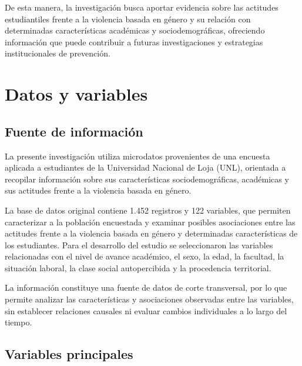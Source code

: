 \documentclass[
  spanish,
  11pt,
  letterpaper,
  DIV=11,
  numbers=noendperiod]{scrreprt}
\begin{document}
De esta manera, la investigación busca aportar evidencia sobre las
actitudes estudiantiles frente a la violencia basada en género y su
relación con determinadas características académicas y
sociodemográficas, ofreciendo información que puede contribuir a futuras
investigaciones y estrategias institucionales de prevención.


\chapter{Datos y variables}\label{datos-y-variables}

\section{Fuente de información}\label{fuente-de-informaciuxf3n}

La presente investigación utiliza microdatos provenientes de una
encuesta aplicada a estudiantes de la Universidad Nacional de Loja
(UNL), orientada a recopilar información sobre sus características
sociodemográficas, académicas y sus actitudes frente a la violencia
basada en género.

La base de datos original contiene 1.452 registros y 122 variables, que
permiten caracterizar a la población encuestada y examinar posibles
asociaciones entre las actitudes frente a la violencia basada en género
y determinadas características de los estudiantes. Para el desarrollo
del estudio se seleccionaron las variables relacionadas con el nivel de
avance académico, el sexo, la edad, la facultad, la situación laboral,
la clase social autopercibida y la procedencia territorial.

La información constituye una fuente de datos de corte transversal, por
lo que permite analizar las características y asociaciones observadas
entre las variables, sin establecer relaciones causales ni evaluar
cambios individuales a lo largo del tiempo.

\section{Variables principales}\label{variables-principales}

\begingroup\fontsize{9}{11}\selectfont
\end{document}
